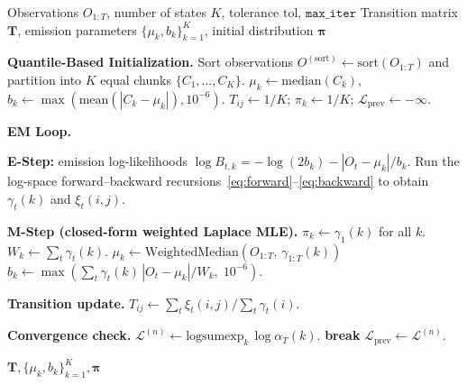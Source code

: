 \begin{algorithm}[tp]
\caption{EM algorithm for continuous Laplace HMM (CHMM-L) parameter estimation}
\label{alg:em_laplace}
\small
\begin{algorithmic}[1]
\REQUIRE Observations $O_{1:T}$, number of states $K$, tolerance $\text{tol}$, $\texttt{max\_iter}$
\ENSURE Transition matrix $\mathbf{T}$, emission parameters $\{\mu_k, b_k\}_{k=1}^K$, initial distribution $\boldsymbol{\pi}$

\STATE \textbf{Quantile-Based Initialization.}
\STATE Sort observations $O^{(\text{sort})} \leftarrow \text{sort}(O_{1:T})$ and partition into $K$ equal chunks $\{C_1, \ldots, C_K\}$.
    \STATE $\mu_k \leftarrow \text{median}(C_k)$, \quad $b_k \leftarrow \max(\text{mean}(|C_k - \mu_k|), 10^{-6})$.
\ENDFOR
\STATE $T_{ij} \leftarrow 1/K$; \quad $\pi_k \leftarrow 1/K$; \quad $\mathcal{L}_{\text{prev}} \leftarrow -\infty$.

\STATE \textbf{EM Loop.}

    \STATE \textbf{E-Step:} emission log-likelihoods $\log B_{t,k} = -\log(2 b_k) - |O_t - \mu_k| / b_k$.
    \STATE Run the log-space forward--backward recursions~\eqref{eq:forward}--\eqref{eq:backward} to obtain $\gamma_t(k)$ and $\xi_t(i,j)$.

    \STATE \textbf{M-Step (closed-form weighted Laplace MLE).}
    \STATE $\pi_k \leftarrow \gamma_1(k)$ for all $k$.
        \STATE $W_k \leftarrow \sum_t \gamma_t(k)$.
        \STATE $\mu_k \leftarrow \text{WeightedMedian}(O_{1:T},\, \gamma_{1:T}(k))$ 
        \STATE $b_k \leftarrow \max\!\left(\sum_t \gamma_t(k)\, |O_t - \mu_k| / W_k,\; 10^{-6}\right)$.
    \ENDFOR

    \STATE \textbf{Transition update.} $T_{ij} \leftarrow \sum_t \xi_t(i,j) / \sum_t \gamma_t(i)$.

    \STATE \textbf{Convergence check.} $\mathcal{L}^{(n)} \leftarrow \text{logsumexp}_k\, \log \alpha_T(k)$.  \STATE \textbf{break} \ENDIF
    \STATE $\mathcal{L}_{\text{prev}} \leftarrow \mathcal{L}^{(n)}$.
\ENDFOR

\RETURN $\mathbf{T}, \{\mu_k, b_k\}_{k=1}^K, \boldsymbol{\pi}$
\end{algorithmic}
\end{algorithm}

